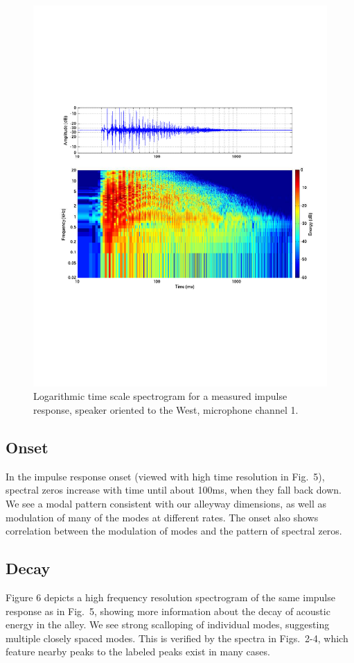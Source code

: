 \documentclass{aes137}
\begin{document}
\begin{figure}[h!] \centering \includegraphics[width=\linewidth]{images/P14IR_irsg_cropped.pdf} \caption{Logarithmic time scale spectrogram for a measured impulse response, speaker oriented to the West, microphone channel 1.} \end{figure}

\subsection{Onset}
In the impulse response onset (viewed with high time resolution in Fig.~5), spectral zeros increase with time until about 100ms, when they fall back down. We see a modal pattern consistent with our alleyway dimensions, as well as modulation of many of the modes at different rates. The onset also shows correlation between the modulation of modes and the pattern of spectral zeros.

\subsection{Decay}
Figure 6 depicts a high frequency resolution spectrogram of the same impulse response as in Fig.~5, showing more information about the decay of acoustic energy in the alley. We see strong scalloping of individual modes, suggesting multiple closely spaced modes. This is verified by the spectra in Figs.~2-4, which feature nearby peaks to the labeled peaks exist in many cases.
\end{document}
